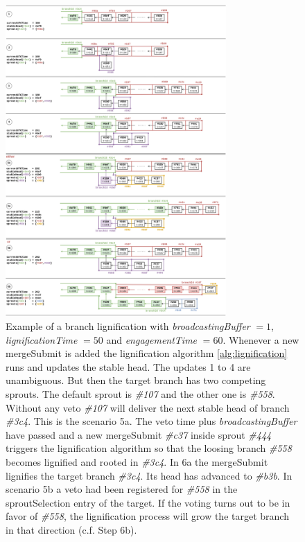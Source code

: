 \begin{figure}[h!]
  \begin{center}
    \includegraphics[width=0.75\textwidth]{src/img/LignificationProcessV7.png}
\end{center}
 \caption{Example of a branch lignification with \textit{broadcastingBuffer} $=1$, \textit{lignificationTime} $=50$ and \textit{engagementTime} $=60$. Whenever a new mergeSubmit is added the lignification algorithm \ref{alg:lignification} runs and updates the stable head. The updates 1 to 4 are unambiguous. But then the target branch has two competing sprouts. The default sprout is \textit{\#107} and the other one is \textit{\#558}. Without any veto \textit{\#107} will deliver the next stable head of branch \textit{\#3c4}. This is the scenario 5a. The veto time plus \textit{broadcastingBuffer} have passed and a new mergeSubmit \textit{\#c37} inside sprout \textit{\#444} triggers the lignification algorithm so that the loosing branch \textit{\#558} becomes lignified and rooted in \textit{\#3c4}. In 6a the mergeSubmit lignifies the target branch \textit{\#3c4}. Its head has advanced to \textit{\#b3b}. In scenario 5b a veto had been registered for \textit{\#558} in the sproutSelection entry of the target. If the voting turns out to be in favor of \textit{\#558}, the lignification process will grow the target branch in that direction (c.f. Step 6b).}
 \label{fig:bufferbranches}
\end{figure}





